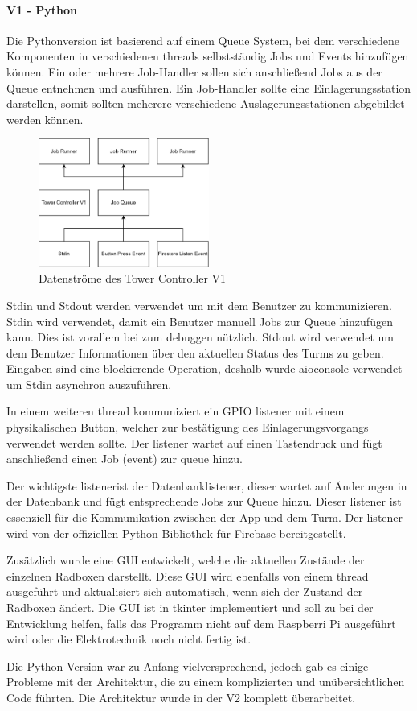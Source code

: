 \paragraph{V1 - Python}
Die Pythonversion ist basierend auf einem Queue System, bei dem verschiedene Komponenten in verschiedenen \Glspl{thread} selbstständig Jobs und Events hinzufügen können. Ein oder mehrere Job-Handler sollen sich anschließend Jobs aus der Queue entnehmen und ausführen. Ein Job-Handler sollte eine Einlagerungsstation darstellen, somit sollten meherere verschiedene Auslagerungsstationen abgebildet werden können.

\begin{figure}
  \centering
  \includegraphics[width=0.5\textwidth]{images/tower_controller_v1.png}
  \caption{Datenströme des Tower Controller V1}
  \label{fig:tower_controller_v1}
\end{figure}

\ac{Stdin} und \ac{Stdout} werden verwendet um mit dem Benutzer zu kommunizieren. \ac{Stdin} wird verwendet, damit ein Benutzer manuell Jobs zur Queue hinzufügen kann. Dies ist vorallem bei zum \Gls{debuggen} nützlich. \ac{Stdout} wird verwendet um dem Benutzer Informationen über den aktuellen Status des Turms zu geben. Eingaben sind eine blockierende Operation, deshalb wurde aioconsole verwendet um \ac{Stdin} asynchron auszuführen.

In einem weiteren \Gls{thread} kommuniziert ein \ac{GPIO} \Gls{listener} mit einem physikalischen Button, welcher zur bestätigung des Einlagerungsvorgangs verwendet werden sollte. Der \Gls{listener} wartet auf einen Tastendruck und fügt anschließend einen Job (\Gls{event}) zur \Gls{queue} hinzu.

Der wichtigste \Gls{listener}ist der Datenbanklistener, dieser wartet auf Änderungen in der Datenbank und fügt entsprechende Jobs zur Queue hinzu. Dieser \Gls{listener} ist essenziell für die Kommunikation zwischen der App und dem Turm. Der \Gls{listener} wird von der offiziellen Python Bibliothek für Firebase bereitgestellt.

Zusätzlich wurde eine \ac{GUI} entwickelt, welche die aktuellen Zustände der einzelnen Radboxen darstellt. Diese \ac{GUI} wird ebenfalls von einem \Gls{thread} ausgeführt und aktualisiert sich automatisch, wenn sich der Zustand der Radboxen ändert. Die \ac{GUI} ist in tkinter implementiert und soll zu bei der Entwicklung helfen, falls das Programm nicht auf dem Raspberri Pi ausgeführt wird oder die Elektrotechnik noch nicht fertig ist.

Die Python Version war zu Anfang vielversprechend, jedoch gab es einige Probleme mit der Architektur, die zu einem komplizierten und unübersichtlichen Code führten. Die Architektur wurde in der V2 komplett überarbeitet.
